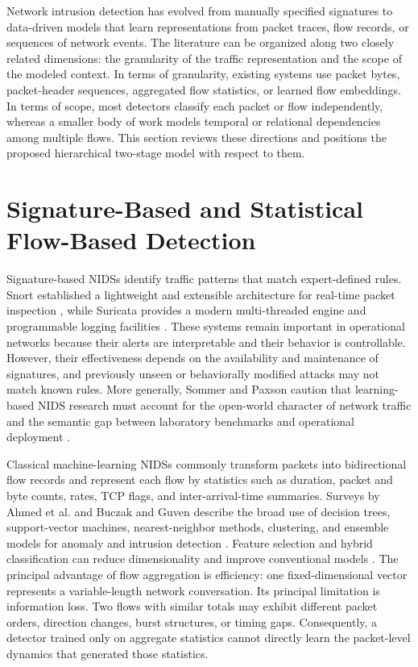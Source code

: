 \documentclass[11pt,fleqn]{report}
\begin{document}
Network intrusion detection has evolved from manually specified signatures to data-driven models that learn representations from packet traces, flow records, or sequences of network events. The literature can be organized along two closely related dimensions: the granularity of the traffic representation and the scope of the modeled context. In terms of granularity, existing systems use
packet bytes, packet-header sequences, aggregated flow statistics, or learned flow embeddings. In terms of scope, most detectors classify each packet or flow independently, whereas a smaller body of work models temporal or relational dependencies among multiple flows. This section reviews these directions and positions the proposed hierarchical two-stage model with respect to them.

\section{Signature-Based and Statistical Flow-Based Detection}
\label{subsec:rw_signature_flow}

Signature-based NIDSs identify traffic patterns that match expert-defined rules. Snort established a lightweight and extensible architecture for real-time packet inspection \cite{Roesch1999}, while Suricata provides a modern multi-threaded engine and programmable logging facilities \cite{SuricataGuide2026}. These systems remain important in operational networks because their alerts are interpretable and their behavior is controllable. However, their effectiveness depends on the availability and maintenance of signatures, and previously unseen or behaviorally modified
attacks may not match known rules. More generally, Sommer and Paxson caution that learning-based NIDS research must account for the open-world character of network traffic and the semantic gap between laboratory benchmarks and operational deployment \cite{SommerPaxson2010}.

Classical machine-learning NIDSs commonly transform packets into bidirectional flow records and represent each flow by statistics such as duration, packet and byte counts, rates, TCP flags, and inter-arrival-time summaries. Surveys by Ahmed et al. and Buczak and Guven describe the broad use of decision trees, support-vector machines, nearest-neighbor methods, clustering, and ensemble
models for anomaly and intrusion detection \cite{Ahmed2016Survey,BuczakGuven2016}. Feature selection and hybrid classification can reduce dimensionality and improve conventional models
\cite{Aljawarneh2018}. The principal advantage of flow aggregation is efficiency: one fixed-dimensional vector represents a variable-length network conversation. Its principal limitation is information loss. Two flows with similar totals may exhibit different packet orders, direction changes, burst structures, or timing gaps. Consequently, a detector trained only on aggregate
statistics cannot directly learn the packet-level dynamics that generated those statistics.
\end{document}
